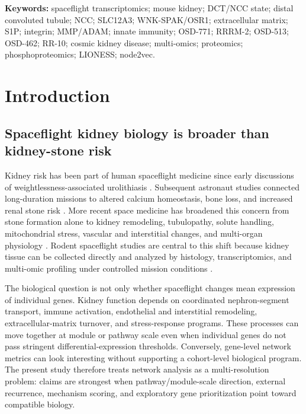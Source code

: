 \documentclass[11pt]{article}
\begin{document}
\vspace{0.3em}
\noindent\textbf{Keywords:} spaceflight transcriptomics; mouse kidney; DCT/NCC state; distal convoluted tubule; NCC; SLC12A3; WNK-SPAK/OSR1; extracellular matrix; S1P; integrin; MMP/ADAM; innate immunity; OSD-771; RRRM-2; OSD-513; OSD-462; RR-10; cosmic kidney disease; multi-omics; proteomics; phosphoproteomics; LIONESS; node2vec.

\clearpage
\tableofcontents
\clearpage

\section{Introduction}

\subsection{Spaceflight kidney biology is broader than kidney-stone risk}

Kidney risk has been part of human spaceflight medicine since early discussions of weightlessness-associated urolithiasis \citep{cockett1962astronautical}. Subsequent astronaut studies connected long-duration missions to altered calcium homeostasis, bone loss, and increased renal stone risk \citep{pietrzyk2007renal,smith2014men}. More recent space medicine has broadened this concern from stone formation alone to kidney remodeling, tubulopathy, solute handling, mitochondrial stress, vascular and interstitial changes, and multi-organ physiology \citep{siew2024cosmic,chouker2025impact,afshinnekoo2020fundamental}. Rodent spaceflight studies are central to this shift because kidney tissue can be collected directly and analyzed by histology, transcriptomics, and multi-omic profiling under controlled mission conditions \citep{daSilveira2020comprehensive,galazka2020rnaseq,finch2025strain}.

The biological question is not only whether spaceflight changes mean expression of individual genes. Kidney function depends on coordinated nephron-segment transport, immune activation, endothelial and interstitial remodeling, extracellular-matrix turnover, and stress-response programs. These processes can move together at module or pathway scale even when individual genes do not pass stringent differential-expression thresholds. Conversely, gene-level network metrics can look interesting without supporting a cohort-level biological program. The present study therefore treats network analysis as a multi-resolution problem: claims are strongest when pathway/module-scale direction, external recurrence, mechanism scoring, and exploratory gene prioritization point toward compatible biology.
\end{document}
